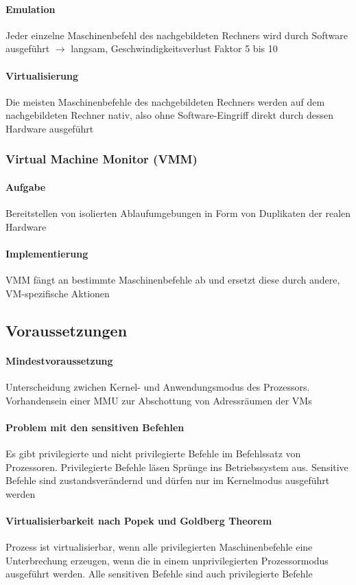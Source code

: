 \documentclass[11pt,a4paper,landscape]{article}
\begin{document}
\begin{multicols*}{3}
	\paragraph{Emulation} Jeder einzelne Maschinenbefehl des nachgebildeten Rechners wird durch Software ausgeführt $\rightarrow$ langsam, Geschwindigkeitsverlust Faktor 5 bis 10
	\paragraph{Virtualisierung} Die meisten Maschinenbefehle des nachgebildeten Rechners werden auf dem nachgebildeten Rechner nativ, also ohne Software-Eingriff direkt durch dessen Hardware ausgeführt
	\subsubsection{Virtual Machine Monitor (VMM)}
	\paragraph{Aufgabe} Bereitstellen von isolierten Ablaufumgebungen in Form von Duplikaten der realen Hardware
	\paragraph{Implementierung} VMM fängt an bestimmte Maschinenbefehle ab und ersetzt diese durch andere, VM-spezifische Aktionen
	\subsection{Voraussetzungen}
	\paragraph{Mindestvoraussetzung} Unterscheidung zwichen Kernel- und Anwendungsmodus des Prozessors. Vorhandensein einer MMU zur Abschottung von Adressräumen der VMs
	\paragraph{Problem mit den sensitiven Befehlen} Es gibt privilegierte und nicht privilegierte Befehle im Befehlssatz von Prozessoren. Privilegierte Befehle läsen Sprünge ins Betriebssystem aus. Sensitive Befehle sind zustandsverändernd und dürfen nur im Kernelmodus ausgeführt werden
	\paragraph{Virtualisierbarkeit nach Popek und Goldberg Theorem} Prozess ist virtualisierbar, wenn alle privilegierten Maschinenbefehle eine Unterbrechung erzeugen, wenn die in einem unprivilegierten Prozessormodus ausgeführt werden. Alle sensitiven Befehle sind auch privilegierte Befehle

\end{multicols*}
\end{document}
